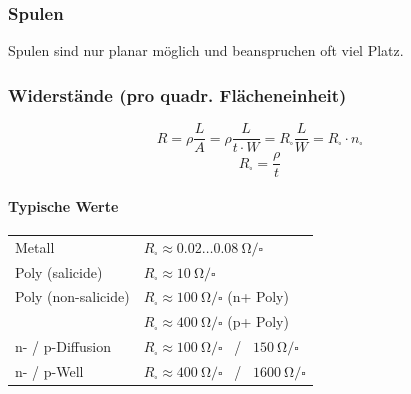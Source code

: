 \subsubsection{Spulen}
Spulen sind nur planar möglich und beanspruchen oft viel Platz.


\subsubsection{Widerstände (pro quadr. Flächeneinheit)}

\begin{minipage}[c]{0.44\columnwidth}
    \[ \boxed{ R = \rho \frac{L}{A} = \rho \frac{L}{t \cdot W} = R_\square \frac{L}{W} = R_\square \cdot n_\square } \]
    \[ \boxed{ R_\square = \frac{\rho}{t} } \]
\end{minipage}
\hfill
\begin{minipage}[c]{0.54\columnwidth}
    \paragraph{Typische Werte}

    \resizebox{\columnwidth}{!}
    {
    \begin{tabular}{@{}l l@{}}
            Metall              & $R_\square \approx 0.02 \dots \qty{0.08}{\ohm}/\square$                           \\
            Poly (salicide)     & $R_\square \approx \qty{10}{\ohm}/\square$                                        \\
            Poly (non-salicide) & $R_\square \approx \qty{100}{\ohm}/\square$ (n+ Poly)                             \\
                                & $R_\square \approx \qty{400}{\ohm}/\square$ (p+ Poly)                             \\
            n- / p-Diffusion    & $R_\square \approx \qty{100}{\ohm}/\square$ \, / \,  $\qty{150}{\ohm}/\square$    \\
            n- / p-Well         & $R_\square \approx \qty{400}{\ohm}/\square$ \, / \,  $\qty{1600}{\ohm}/\square$   \\
        \end{tabular}
    }
\end{minipage}




